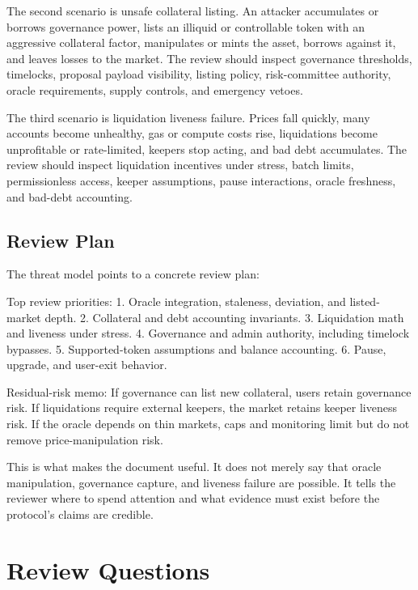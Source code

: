The second scenario is unsafe collateral listing. An attacker accumulates or borrows governance power, lists an illiquid or controllable token with an aggressive collateral factor, manipulates or mints the asset, borrows against it, and leaves losses to the market. The review should inspect governance thresholds, timelocks, proposal payload visibility, listing policy, risk-committee authority, oracle requirements, supply controls, and emergency vetoes.

The third scenario is liquidation liveness failure. Prices fall quickly, many accounts become unhealthy, gas or compute costs rise, liquidations become unprofitable or rate-limited, keepers stop acting, and bad debt accumulates. The review should inspect liquidation incentives under stress, batch limits, permissionless access, keeper assumptions, pause interactions, oracle freshness, and bad-debt accounting.

\subsection{Review Plan}

The threat model points to a concrete review plan:

\begin{codeblock}
Top review priorities:
    1. Oracle integration, staleness, deviation, and listed-market depth.
    2. Collateral and debt accounting invariants.
    3. Liquidation math and liveness under stress.
    4. Governance and admin authority, including timelock bypasses.
    5. Supported-token assumptions and balance accounting.
    6. Pause, upgrade, and user-exit behavior.

Residual-risk memo:
    If governance can list new collateral, users retain governance risk.
    If liquidations require external keepers, the market retains keeper
    liveness risk.
    If the oracle depends on thin markets, caps and monitoring limit but do
    not remove price-manipulation risk.
\end{codeblock}

This is what makes the document useful. It does not merely say that oracle manipulation, governance capture, and liveness failure are possible. It tells the reviewer where to spend attention and what evidence must exist before the protocol's claims are credible.

\section*{Review Questions}

